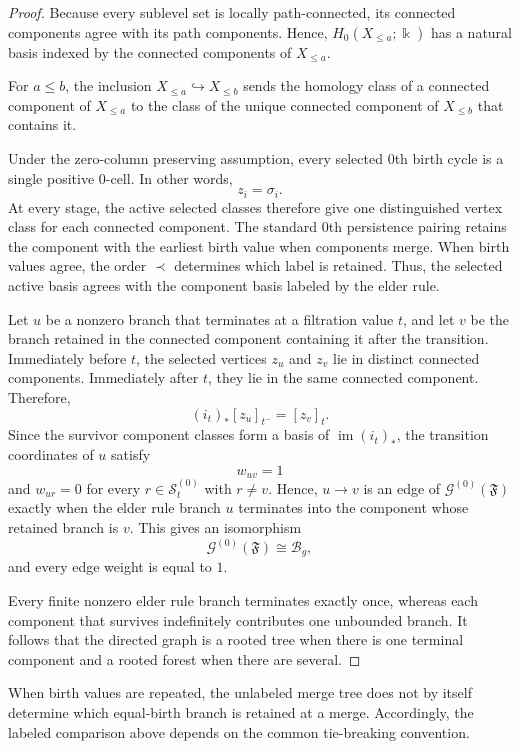 \documentclass[11pt]{article}
\theoremstyle{paperdefinition}
\theoremstyle{paperplain}
\theoremstyle{paperremark}
\begin{document}
\begin{proof}
Because every sublevel set is locally path-connected, its connected components agree with its path components. Hence, $H_0(X_{\leq a};\Bbbk)$ has a natural basis indexed by the connected components of $X_{\leq a}$.

For $a\leq b$, the inclusion $X_{\leq a}\hookrightarrow X_{\leq b}$ sends the homology class of a connected component of $X_{\leq a}$ to the class of the unique connected component of $X_{\leq b}$ that contains it.

Under the zero-column preserving assumption, every selected $0$th birth cycle is a single positive $0$-cell. In other words,
\[
z_i=\sigma_i.
\]
At every stage, the active selected classes therefore give one distinguished vertex class for each connected component. The standard $0$th persistence pairing retains the component with the earliest birth value when components merge. When birth values agree, the order $\prec$ determines which label is retained. Thus, the selected active basis agrees with the component basis labeled by the elder rule.

Let $u$ be a nonzero branch that terminates at a filtration value $t$, and let $v$ be the branch retained in the connected component containing it after the transition. Immediately before $t$, the selected vertices $z_u$ and $z_v$ lie in distinct connected components. Immediately after $t$, they lie in the same connected component. Therefore,
\[
(i_t)_*[z_u]_{t^-} = [z_v]_t.
\]
Since the survivor component classes form a basis of $\operatorname{im}(i_t)_*$, the transition coordinates of $u$ satisfy
\[
w_{uv}=1
\]
and $w_{ur}=0$ for every $r\in\mathcal S_t^{(0)}$ with $r\neq v$. Hence, $u\longrightarrow v$ is an edge of $\mathcal G^{(0)}(\mathfrak F)$ exactly when the
elder rule branch $u$ terminates into the component whose retained branch is $v$. This gives an isomorphism
\[
\mathcal G^{(0)}(\mathfrak F) \cong \mathcal B_g,
\]
and every edge weight is equal to $1$.

Every finite nonzero elder rule branch terminates exactly once, whereas each component that survives indefinitely contributes one unbounded branch. It follows that the directed graph is a rooted tree when there is one terminal component and a rooted forest when there are several.
\end{proof}

When birth values are repeated, the unlabeled merge tree does not by itself determine which equal-birth branch is retained at a merge. Accordingly, the labeled comparison above depends on the common tie-breaking convention.
\end{document}

